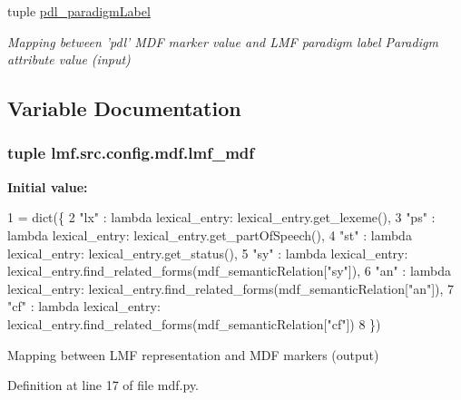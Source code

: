 \begin{DoxyCompactItemize}
tuple \hyperlink{namespacelmf_1_1src_1_1config_1_1mdf_a8e61adc475ca415a33c85ef16c96d03d}{pdl\+\_\+paradigm\+Label}
\begin{DoxyCompactList}\small\item\em Mapping between 'pdl' M\+D\+F marker value and L\+M\+F paradigm label Paradigm attribute value (input) \end{DoxyCompactList}\end{DoxyCompactItemize}


\subsection{Variable Documentation}
\hypertarget{namespacelmf_1_1src_1_1config_1_1mdf_a78d8f1444783c1b86cbbd91f49a0cd4f}{
\subsubsection[{lmf\+\_\+mdf}]{\setlength{\rightskip}{0pt plus 5cm}tuple lmf.\+src.\+config.\+mdf.\+lmf\+\_\+mdf}}\label{namespacelmf_1_1src_1_1config_1_1mdf_a78d8f1444783c1b86cbbd91f49a0cd4f}
{\bfseries Initial value\+:}
\begin{DoxyCode}
1 = dict(\{
2     \textcolor{stringliteral}{"lx"} : \textcolor{keyword}{lambda} lexical\_entry: lexical\_entry.get\_lexeme(),
3     \textcolor{stringliteral}{"ps"} : \textcolor{keyword}{lambda} lexical\_entry: lexical\_entry.get\_partOfSpeech(),
4     \textcolor{stringliteral}{"st"} : \textcolor{keyword}{lambda} lexical\_entry: lexical\_entry.get\_status(),
5     \textcolor{stringliteral}{"sy"} : \textcolor{keyword}{lambda} lexical\_entry: lexical\_entry.find\_related\_forms(mdf\_semanticRelation[\textcolor{stringliteral}{"sy"}]),
6     \textcolor{stringliteral}{"an"} : \textcolor{keyword}{lambda} lexical\_entry: lexical\_entry.find\_related\_forms(mdf\_semanticRelation[\textcolor{stringliteral}{"an"}]),
7     \textcolor{stringliteral}{"cf"} : \textcolor{keyword}{lambda} lexical\_entry: lexical\_entry.find\_related\_forms(mdf\_semanticRelation[\textcolor{stringliteral}{"cf"}])
8 \})
\end{DoxyCode}


Mapping between L\+M\+F representation and M\+D\+F markers (output) 



Definition at line 17 of file mdf.\+py.

